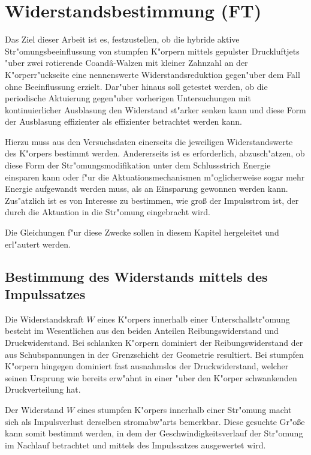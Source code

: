 \chapter{Widerstandsbestimmung (FT)}\label{s:widerstandsbestimmung}

Das Ziel dieser Arbeit ist es, festzustellen, ob die hybride aktive Str"omungsbeeinflussung von stumpfen K"orpern mittels gepulster Druckluftjets "uber zwei rotierende Coand\^{a}-Walzen mit kleiner Zahnzahl an der K"orperr"uckseite eine nennenswerte Widerstandsreduktion gegen"uber dem Fall ohne Beeinflussung erzielt. 
Dar"uber hinaus soll getestet werden, ob die periodische Aktuierung gegen"uber vorherigen Untersuchungen mit kontinuierlicher Ausblasung den Widerstand  st"arker senken kann und diese Form der Ausblasung effizienter als effizienter betrachtet werden kann.

Hierzu muss aus den Versuchsdaten einerseits die jeweiligen Widerstandswerte des K"orpers bestimmt werden. Andererseits ist es erforderlich, abzusch"atzen, ob diese Form der Str"omungsmodifikation unter dem Schlussstrich Energie einsparen kann oder f"ur die Aktuationsmechanismen m"oglicherweise sogar mehr Energie aufgewandt werden muss, als an Einsparung gewonnen werden kann.
Zus"atzlich ist es von Interesse zu bestimmen, wie gro\ss{} der Impulsstrom ist, der durch die Aktuation in die Str"omung eingebracht wird.

Die Gleichungen f"ur diese Zwecke sollen in diesem Kapitel hergeleitet und erl"autert werden.

\section{Bestimmung des Widerstands mittels des Impulssatzes}
\label{sec:WueberImpulssatz}
Die Widerstandskraft $W$ eines K"orpers innerhalb einer Unterschallstr"omung besteht im Wesentlichen aus den beiden Anteilen Reibungswiderstand und Druckwiderstand.
Bei schlanken K"orpern dominiert der Reibungswiderstand der aus Schubspannungen in der Grenzschicht der Geometrie resultiert. Bei stumpfen K"orpern hingegen dominiert fast ausnahmslos der Druckwiderstand, welcher seinen Ursprung wie bereits erw"ahnt in einer "uber den K"orper schwankenden Druckverteilung hat.


Der Widerstand $W$ eines stumpfen K"orpers innerhalb einer Str"omung macht sich als Impulsverlust derselben stromabw"arts bemerkbar. Diese gesuchte Gr"o\ss{}e kann somit bestimmt werden, in dem der Geschwindigkeitsverlauf der Str"omung im Nachlauf betrachtet und mittels des Impulssatzes ausgewertet wird. 

